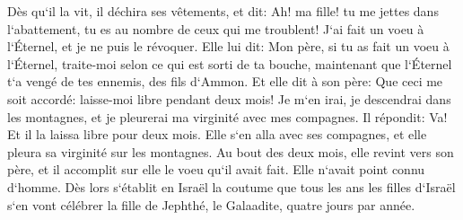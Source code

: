 \verse Dès qu`il la vit, il déchira ses vêtements, et dit: Ah! ma fille! tu me jettes dans l`abattement, tu es au nombre de ceux qui me troublent! J`ai fait un voeu à l`Éternel, et je ne puis le révoquer. 
\verse Elle lui dit: Mon père, si tu as fait un voeu à l`Éternel, traite-moi selon ce qui est sorti de ta bouche, maintenant que l`Éternel t`a vengé de tes ennemis, des fils d`Ammon. 
\verse Et elle dit à son père: Que ceci me soit accordé: laisse-moi libre pendant deux mois! Je m`en irai, je descendrai dans les montagnes, et je pleurerai ma virginité avec mes compagnes. 
\verse Il répondit: Va! Et il la laissa libre pour deux mois. Elle s`en alla avec ses compagnes, et elle pleura sa virginité sur les montagnes. 
\verse Au bout des deux mois, elle revint vers son père, et il accomplit sur elle le voeu qu`il avait fait. Elle n`avait point connu d`homme. Dès lors s`établit en Israël la coutume 
\verse que tous les ans les filles d`Israël s`en vont célébrer la fille de Jephthé, le Galaadite, quatre jours par année. 

